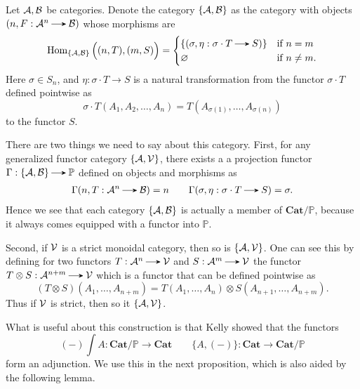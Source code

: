 \begin{definition}
    Let $\mathcal{A}, \mathcal{B}$ be categories.
    Denote the category $\{\mathcal{A}, \mathcal{B}\}$
    as the category with objects $(n, F: \aa^n \to \bb)$ 
    whose morphisms are 
    \[
        \hom_{\{\aa, \bb\}}\Big((n, T), (m,S)\Big)
        =
        \begin{cases}   
            \{(\sigma, \eta: \sigma\cdot T \to S) \} & \text{if } n = m\\
            \varnothing & \text{if } n \ne m.
        \end{cases}
    \]
    Here $\sigma \in S_n$, and $\eta: \sigma \cdot T \to S$ is a natural transformation from the functor $\sigma \cdot T$ defined pointwise as 
    \[
        \sigma \cdot T(A_1, A_2, \dots, A_n)
        =
        T(A_{\sigma(1)}, \dots, A_{\sigma(n)})
    \]
    to the functor $S$. 
\end{definition}


    There are two things we need to say about this category.
    First, for any generalized functor category $\{\mathcal{A}, \mathcal{V}\}$, there exists a a projection functor 
    $\Gamma: \{\aa, \bb\} \to \mathbb{P}$ defined on objects and morphisms as
    \begin{gather*}
        \Gamma(n, T: \aa^n \to \bb) = n 
        \qquad 
        \Gamma(\sigma, \eta: \sigma\cdot T \to S)
        = 
        \sigma.
    \end{gather*}
    Hence we see that each category $\{\mathcal{A}, \mathcal{B}\}$ is actually a member of $\textbf{Cat}/\mathbb{P}$, because it always comes equipped with a functor into $\mathbb{P}$.
    
    Second, if $\mathcal{V}$ is a strict monoidal category, then so is $\{\mathcal{A}, \mathcal{V}\}$. One can see this by defining for 
    two functors $T: \aa^n \to \vv$ and $S: \aa^m \to \vv$ the functor
    $T \otimes S: \aa^{n+m} \to \vv$ which is a functor that can be defined pointwise as 
    \[
        (T \otimes S)(A_1, \dots, A_{n+m}) = T(A_1, \dots, A_n)\otimes S(A_{n+1}, \dots, A_{n+m}).
    \]
    Thus if $\mathcal{V}$ is strict, then so it $\{\mathcal{A}, \mathcal{V}\}$.

What is useful about this construction is that 
Kelly showed that the functors 
\[
    (-)\int A : \textbf{Cat}/\mathbb{P} \to \textbf{Cat} 
    \qquad 
    \{A, (-) \}: \textbf{Cat}\to \textbf{Cat}/\mathbb{P}
\]
form an adjunction. 
We use this in the next proposition, which is also aided by the following lemma. 

